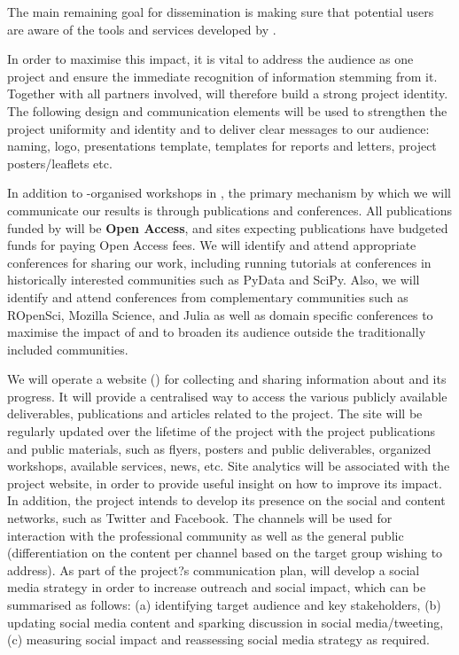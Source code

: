 The main remaining goal for dissemination is making sure that potential users 
are aware of the tools and services developed by \TheProject.

In order to maximise this impact, it is vital to address the audience as one project 
and ensure the immediate recognition of information stemming from it.
Together with all partners involved, \TheProject will therefore build a strong project identity. 
The following design and communication elements will be used to strengthen the project 
uniformity and identity and to deliver clear messages to our audience: \TheProject naming, logo, 
presentations template, templates for reports and letters, project posters/leaflets etc.

In addition to \TheProject-organised workshops in ,
the primary mechanism by which we will communicate our results is through publications and conferences.
All publications funded by \TheProject will be \textbf{Open Access},
and sites expecting publications have budgeted funds for paying Open Access fees.
We will identify and attend appropriate conferences for sharing our work,
including running tutorials at conferences in historically interested communities such as PyData and SciPy.
Also, we will identify and attend conferences from complementary communities such as ROpenSci, 
Mozilla Science, and Julia
as well as domain specific conferences to maximise the impact of \TheProject and to broaden its 
audience outside the
traditionally included communities.

We will operate a website ()
for collecting and sharing information about \TheProject and its progress.
It will provide a centralised way to access the various publicly available deliverables, publications 
and articles related
to the project. The site will be regularly updated over the lifetime of the project 
with the project publications and public materials, such as flyers, posters and
public deliverables, organized workshops, available services, news, etc.
Site analytics will be associated with the project website, in order
to provide useful insight on how to improve its impact. In addition, the project intends to 
develop its presence on the social and content
networks, such as Twitter and Facebook. The channels will be used for interaction 
with the professional community as well as the general public 
(differentiation on the content per channel based on the target group wishing to address). 
As part of the project?s communication plan, \TheProject will develop a social media strategy 
in order to increase outreach and social impact, which can be summarised as follows: (a) identifying target
audience and key stakeholders, (b) updating social media content and sparking 
discussion in social media/tweeting, (c) measuring social impact and reassessing 
social media strategy as required.
